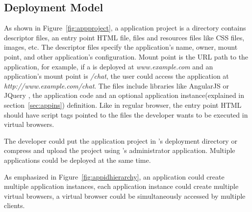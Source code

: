 \subsection{Deployment Model}
\appprojectfig{}
As shown in Figure~\ref{fig:appproject}, 
a \cb application project is a directory
contains descriptor files, an entry point HTML file,
\js files and resources files like CSS files, images, etc.
The descriptor files specify the application's name, owner, mount point, and
other application's configuration.
Mount point is the URL path to the application, for example,
if a \cb is deployed at \emph{www.example.com} and an application's mount point is
\emph{/chat}, the user could access the application at \emph{http://www.example.com/chat}.
The \js files include libraries like AngularJS or JQuery
, the application code and an optional application instance(explained 
in section~\ref{sec:appins}) definition.
Like in regular browser, the entry point HTML should have script tags
pointed to the \js files the developer wants to be executed in virtual browsers.

The developer could put the application project in \cb's deployment 
directory or compress and upload the project using \cb's administrator application.
Multiple applications could be deployed at the same time.

\apphierarchyfig{}

As emphasized in Figure~\ref{fig:appidhierarchy},
an application could create multiple application instances,
each application instance could create multiple virtual browsers,
a virtual browser could be simultaneously accessed by multiple clients.



